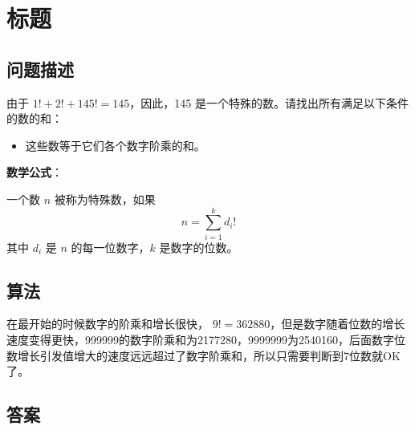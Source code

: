 \section{标题}
\subsection{问题描述}
\begin{tcolorbox}

	由于 $1! + 2! + 145! = 145$，因此，145 是一个特殊的数。请找出所有满足以下条件的数的和：
	\begin{itemize}
		\item 这些数等于它们各个数字阶乘的和。
	\end{itemize}

	\textbf{数学公式}：

	一个数 $n$ 被称为特殊数，如果
	\[
		n = \sum_{i=1}^{k} d_i!
	\]
	其中 $d_i$ 是 $n$ 的每一位数字，$k$ 是数字的位数。
\end{tcolorbox}

\subsection{算法}
在最开始的时候数字的阶乘和增长很快， \( 9! = 362880
\)，但是数字随着位数的增长速度变得更快，\num{999999}的数字阶乘和为\num{2177280}，\num{9999999}为\num{2540160}，后面数字位数增长引发值增大的速度远远超过了数字阶乘和，所以只需要判断到7位数就OK了。

\subsection{答案}
